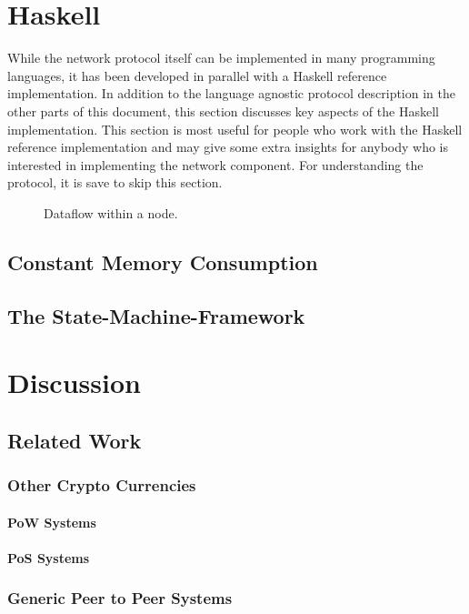 \documentclass{report}
\theoremstyle{definition}{
  \newtheorem{lemma}{Lemma}[section] %
  \newtheorem{definition}[lemma]{Definition}
}
\theoremstyle{theorem}{
  \newtheorem{invariant}[lemma]{Invariant}
  \newtheorem{proofobligation}[lemma]{Proof Obligation}
}
\numberwithin{equation}{lemma}
\begin{document}
\chapter{Haskell}
While the network protocol itself can be implemented in many programming languages,
it has been developed in parallel with a Haskell reference implementation.
In addition to the language agnostic protocol description in the other parts of this document,
this section discusses key aspects of the Haskell implementation.
This section is most useful for people who work with the Haskell reference implementation and
may give some extra insights for anybody who is interested in implementing the
network component.
For understanding the protocol, it is save to skip this section.
\begin{figure}
\begin{center}
\end{center}
\caption{Dataflow within a node.}
\label{node-diagram-concurency}
\end{figure}
\section{Constant Memory Consumption}
\section{The State-Machine-Framework}
\label{Haskell-state-machine}

\chapter{Discussion}
\section{Related Work}
\subsection{Other Crypto Currencies}
\subsubsection{PoW Systems}
\subsubsection{PoS Systems}
\subsection{Generic Peer to Peer Systems}
\end{document}
